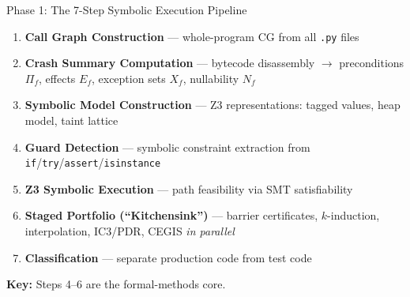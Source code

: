 \documentclass[aspectratio=169]{beamer}
\begin{document}
\begin{frame}{Phase 1: The 7-Step Symbolic Execution Pipeline}

\begin{enumerate}
  \item \textbf{Call Graph Construction} --- whole-program CG from all \texttt{.py} files
  \item \textbf{Crash Summary Computation} --- bytecode disassembly $\to$ preconditions $\Pi_f$, effects $E_f$, exception sets $X_f$, nullability $N_f$
  \item \textbf{Symbolic Model Construction} --- Z3 representations: tagged values, heap model, taint lattice
  \item \textbf{Guard Detection} --- symbolic constraint extraction from \texttt{if}/\texttt{try}/\texttt{assert}/\texttt{isinstance}
  \item \textbf{Z3 Symbolic Execution} --- path feasibility via SMT satisfiability
  \item \textbf{Staged Portfolio (``Kitchensink'')} --- barrier certificates, $k$-induction, interpolation, IC3/PDR, CEGIS \emph{in parallel}
  \item \textbf{Classification} --- separate production code from test code
\end{enumerate}

\vspace{0.5em}
\textbf{Key:} Steps 4--6 are the formal-methods core.

\end{frame}
\end{document}
